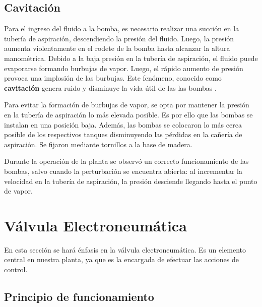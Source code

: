 \subsection{Cavitación}
Para el ingreso del fluido a la bomba, es necesario realizar una succión
en la tubería de aspiración, descendiendo la presión del fluido.
Luego, la presión aumenta violentamente en el rodete de la bomba hasta alcanzar
la altura manométrica.
Debido a la baja presión en la tubería de aspiración, el fluido puede
evaporarse formando burbujas de vapor.
Luego, el rápido aumento de presión provoca una implosión de las burbujas.
Este fenómeno, conocido como \textbf{cavitación} genera ruido y disminuye la
vida útil de las las bombas \cite{bib:ApuntesMDFBombas}.

Para evitar la formación de burbujas de vapor, se opta por mantener la presión
en la tubería de aspiración lo más elevada posible.
Es por ello que las bombas se instalan en una posición baja.
Además, las bombas se colocaron lo más cerca posible de los respectivos
tanques disminuyendo las pérdidas en la cañería de aspiración.
Se fijaron mediante tornillos a la base de madera.

Durante la operación de la planta se observó un correcto funcionamiento de las
bombas, salvo cuando la perturbación se encuentra abierta: al incrementar la
velocidad en la tubería de aspiración, la presión desciende llegando hasta el
punto de vapor.

\section{Válvula Electroneumática}
\label{sec:ValvulaNeumatica}

En esta sección se hará énfasis en la válvula electroneumática.
Es un elemento central en nuestra planta, ya que es la encargada de efectuar
las acciones de control.

\subsection{Principio de funcionamiento}
\label{subsec:principioFuncionamiento}


